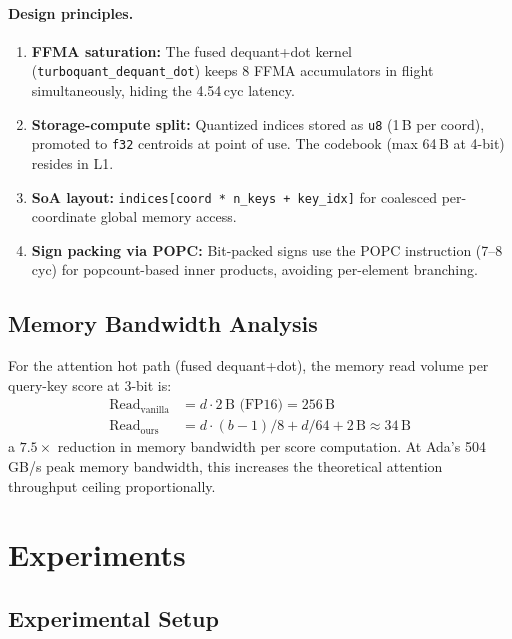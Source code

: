 \documentclass[sigconf,anonymous,review]{acmart}
\begin{document}
\paragraph{Design principles.}
\begin{enumerate}[nosep,leftmargin=*]
  \item \textbf{FFMA saturation:} The fused dequant+dot kernel
        (\texttt{turboquant\_dequant\_dot}) keeps 8 FFMA accumulators
        in flight simultaneously, hiding the 4.54\,cyc latency.
  \item \textbf{Storage-compute split:} Quantized indices stored as
        \texttt{u8} (1\,B per coord), promoted to \texttt{f32} centroids
        at point of use. The codebook (max 64\,B at 4-bit) resides in L1.
  \item \textbf{SoA layout:} \texttt{indices[coord * n\_keys + key\_idx]}
        for coalesced per-coordinate global memory access.
  \item \textbf{Sign packing via POPC:} Bit-packed signs use the POPC
        instruction (7--8\,cyc) for popcount-based inner products,
        avoiding per-element branching.
\end{enumerate}

\subsection{Memory Bandwidth Analysis}

For the attention hot path (fused dequant+dot), the memory read volume
per query-key score at 3-bit is:
\begin{align}
  \text{Read}_{\text{vanilla}} &= d \cdot 2\,\text{B (FP16)} = 256\,\text{B} \\
  \text{Read}_{\text{ours}} &= d \cdot (b{-}1)/8 + d/64 + 2\,\text{B}
    \approx 34\,\text{B}
\end{align}
a $7.5\times$ reduction in memory bandwidth per score computation.
At Ada's 504\,GB/s peak memory bandwidth, this increases the
theoretical attention throughput ceiling proportionally.

\section{Experiments}
\label{sec:experiments}

\subsection{Experimental Setup}
\end{document}
